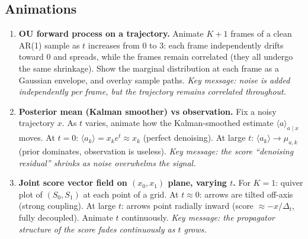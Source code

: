 \documentclass[12pt, a4paper]{article}
\def\ba{a}%
\def\bx{x}%
\def\bm#1{#1}%
\theoremstyle{definition}
\newcommand{\ba}{\bm{a}}
\newcommand{\bx}{\bm{x}}
\newcommand{\dt}{\Delta_t}
\begin{document}
\subsection{Animations}

\begin{enumerate}

  \item \textbf{OU forward process on a trajectory.}
    Animate $K+1$ frames of a clean AR(1) sample as $t$ increases
    from $0$ to $3$: each frame independently drifts toward $0$ and
    spreads, while the frames remain correlated (they all undergo
    the same shrinkage). Show the marginal distribution at each frame
    as a Gaussian envelope, and overlay sample paths.
    \textit{Key message: noise is added independently per frame,
    but the trajectory remains correlated throughout.}

  \item \textbf{Posterior mean (Kalman smoother) vs observation.}
    Fix a noisy trajectory $\bx$. As $t$ varies, animate how the
    Kalman-smoothed estimate $\langle\ba\rangle_{\ba\mid\bx}$ moves.
    At $t=0$: $\langle a_k\rangle = x_k e^{t} \approx x_k$ (perfect
    denoising). At large $t$: $\langle a_k\rangle \to \mu_{a,k}$
    (prior dominates, observation is useless).
    \textit{Key message: the score ``denoising residual'' shrinks as
    noise overwhelms the signal.}

  \item \textbf{Joint score vector field on $(x_0, x_1)$ plane, varying $t$.}
    For $K=1$: quiver plot of $(S_0, S_1)$ at each point of a grid.
    At $t \approx 0$: arrows are tilted off-axis (strong coupling).
    At large $t$: arrows point radially inward (score $\approx -\bx/\dt$,
    fully decoupled). Animate $t$ continuously.
    \textit{Key message: the propagator structure of the score fades
    continuously as $t$ grows.}

\end{enumerate}

\end{document}
